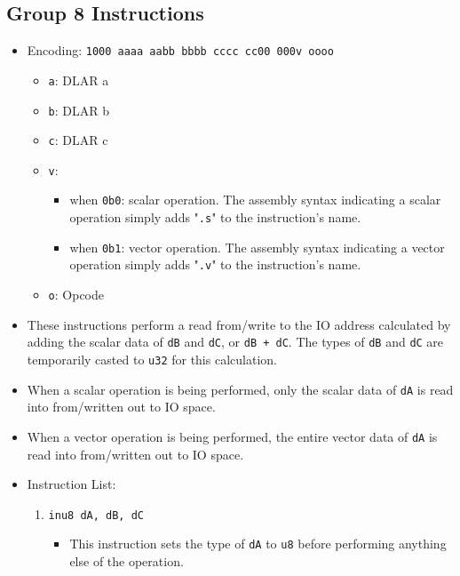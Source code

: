 \documentclass{article}
\begin{document}
	\subsection{Group 8 Instructions}
		\begin{itemize}
		\item Encoding:  \texttt{1000 aaaa aabb bbbb  cccc cc00 000v oooo}
			\begin{itemize}
			\item \texttt{a}:  DLAR a
			\item \texttt{b}:  DLAR b
			\item \texttt{c}:  DLAR c
			\item \texttt{v}:
				\begin{itemize}
				\item when \texttt{0b0}:  scalar operation.  The assembly
				syntax indicating a scalar operation simply adds
				"\texttt{.s}" to the instruction's name.
				\item when \texttt{0b1}:  vector operation.  The assembly
				syntax indicating a vector operation simply adds
				"\texttt{.v}" to the instruction's name.
				\end{itemize}
			\item \texttt{o}:  Opcode
			\end{itemize}

		\item These instructions perform a read from/write to the IO
		address calculated by adding the scalar data of \texttt{dB} and
		\texttt{dC}, or \texttt{dB + dC}.  The types of \texttt{dB} and
		\texttt{dC} are temporarily casted to \texttt{u32} for this
		calculation.

		\item When a scalar operation is being performed, only the
		scalar data of \texttt{dA} is read into from/written out to IO
		space.

		\item When a vector operation is being performed, the
		entire vector data of \texttt{dA} is read into from/written out to
		IO space.

		\item Instruction List:
			\begin{enumerate}
			\item \texttt{inu8 dA, dB, dC}
				\begin{itemize}
				\item This instruction sets the type of \texttt{dA} to
				\texttt{u8} before performing anything else of the
				operation.


\end{itemize}
\end{enumerate}
\end{itemize}
\end{document}
